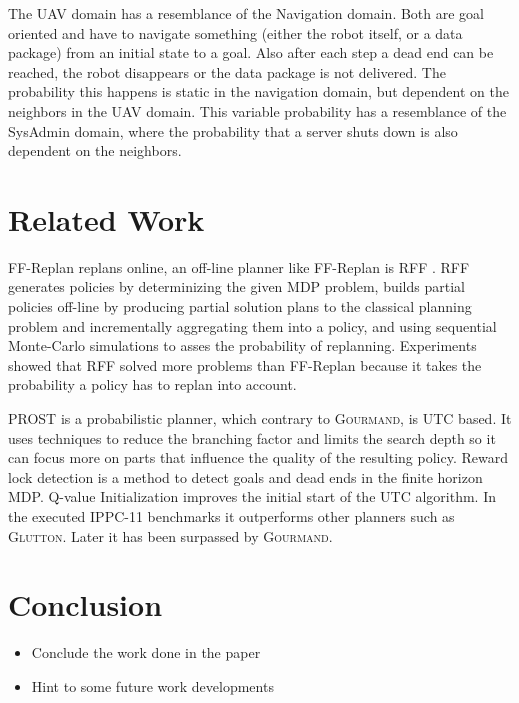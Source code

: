 \documentclass[runningheads,a4paper]{llncs}
\begin{document}
The UAV domain has a resemblance of the Navigation domain. Both are goal
oriented and have to navigate something (either the robot itself, or a data
package) from an initial state to a goal. Also after each step a dead end can
be reached, the robot disappears or the data package is not delivered.
The probability this happens is static in the navigation domain, but dependent
on the neighbors in the UAV domain. This variable probability has a resemblance
of the SysAdmin domain, where the probability that a server shuts down is also
dependent on the neighbors.



\section{Related Work}

FF-Replan replans online, an off-line planner like FF-Replan is RFF
\cite{teichteil2010incremental}. RFF generates policies by determinizing the
given MDP problem, builds partial policies off-line by producing partial
solution plans to the classical planning problem and incrementally aggregating
them into a policy, and using sequential Monte-Carlo simulations to asses the
probability of replanning. Experiments showed that RFF solved more problems
than FF-Replan because it takes the probability a policy has to replan into
account.

PROST \cite{keller2012prost} is a probabilistic planner, which contrary to
\textsc{Gourmand}, is UTC based. It uses techniques to reduce the branching
factor  and limits the search depth so it can focus more on parts that
influence the quality of the resulting policy. Reward lock detection is a
method to detect goals and dead ends in the finite horizon MDP\@. Q-value
Initialization improves the initial start of the UTC algorithm. In the executed
IPPC-11 benchmarks it outperforms other planners such as \textsc{Glutton}.
Later it has been surpassed by \textsc{Gourmand}.


\section{Conclusion}

\begin{itemize}
	\item Conclude the work done in the paper
	\item Hint to some future work developments
\end{itemize}
\end{document}
